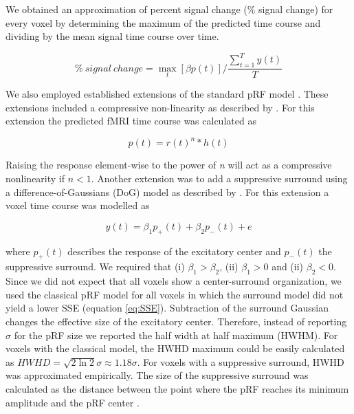 We obtained an approximation of percent signal change (\% signal change) for every voxel by determining the maximum of the predicted time course and dividing by the mean signal time course over time.

\begin{equation}
\%\ signal\ change = \max_t[\beta p(t)] / \frac{\sum_{t=1}^{T}y(t)}{T}
\end{equation}

We also employed established extensions of the standard pRF model \parencite{Zuiderbaan2012, Kay2013}. These extensions included a compressive non-linearity as described by \cite{Kay2013, Kay2015}. For this extension the predicted fMRI time course was calculated as

\begin{equation}
p(t) = r(t)^n \ast h(t)
\end{equation}

Raising the response element-wise to the power of \textit{n} will act as a compressive nonlinearity if $n < 1$. Another extension was to add a suppressive surround using a difference-of-Gaussians (DoG) model as described by \cite{Zuiderbaan2012}. For this extension a voxel time course was modelled as

\begin{equation}
y(t) = \beta_1 p_+(t) + \beta_2 p_-(t) + e
\end{equation}

where $p_+(t)$ describes the response of the excitatory center and $p_-(t)$ the suppressive surround. We required that (i) $\beta_1 > \beta_2$, (ii) $\beta_1 > 0$ and (ii) $\beta_2 < 0$. Since we did not expect that all voxels show a center-surround organization, we used the classical pRF model for all voxels in which the surround model did not yield a lower SSE (equation \ref{eq:SSE}). Subtraction of the surround Gaussian changes the effective size of the excitatory center. Therefore, instead of reporting $\sigma$ for the pRF size we reported the half width at half maximum (HWHM). For voxels with the classical model, the HWHD maximum could be easily calculated as $HWHD = \sqrt{2 \ln{2}} \sigma \approx 1.18 \sigma $. For voxels with a suppressive surround, HWHD was approximated empirically. The size of the suppressive surround was calculated as the distance between the point where the pRF reaches its minimum amplitude and the pRF center \parencite{Zuiderbaan2012}.

